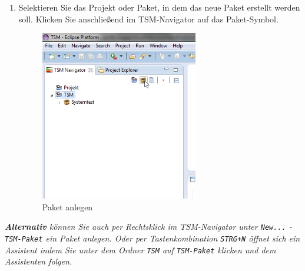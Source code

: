\documentclass[11pt,a4paper,titlepage]{article}
\begin{document}
\begin{enumerate}
\item Selektieren Sie das Projekt oder Paket, in dem das neue Paket erstellt werden soll. Klicken Sie anschließend im TSM-Navigator auf das Paket-Symbol.

\begin{figure}[H]
\centering
\includegraphics[width= 260px]{BilderHandbuchTSMNavigator/Paket/Paket.png}
\caption{Paket anlegen}
\label{fig:Paket}
\end{figure}
\end{enumerate}

\textit{\textbf{Alternativ} können Sie auch per Rechtsklick im TSM-Navigator unter \texttt{New...} - \texttt{TSM-Paket} ein Paket anlegen.
Oder per Tastenkombination \texttt{STRG+N} öffnet sich ein Assistent indem Sie unter dem Ordner \texttt{TSM} auf \texttt{TSM-Paket} klicken und dem Assistenten folgen.}
\end{document}
